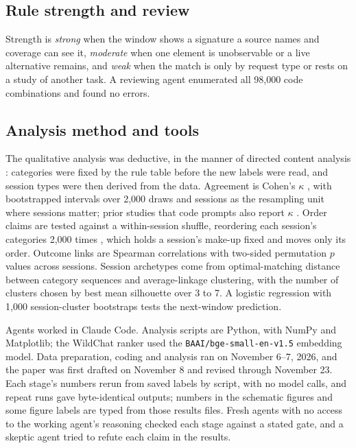 \documentclass[manuscript,screen]{acmart}
\newcommand{\code}[1]{\texttt{#1}}
\begin{document}
\subsection{Rule strength and review}

Strength is \emph{strong} when the window shows a signature a source names and coverage can see it, \emph{moderate} when one element is unobservable or a live alternative remains, and \emph{weak} when the match is only by request type or rests on a study of another task. A reviewing agent enumerated all 98,000 code combinations and found no errors.

\subsection{Analysis method and tools}

The qualitative analysis was deductive, in the manner of directed content analysis \cite{hsieh2005}: categories were fixed by the rule table before the new labels were read, and session types were then derived from the data. Agreement is Cohen's $\kappa$ \cite{cohen1960}, with bootstrapped intervals \cite{efron1994} over 2,000 draws and sessions as the resampling unit where sessions matter; prior studies that code prompts also report $\kappa$ \cite{jelson2026chi,poquet2026}. Order claims are tested against a within-session shuffle, reordering each session's categories 2,000 times \cite{good2005}, which holds a session's make-up fixed and moves only its order. Outcome links are Spearman correlations \cite{spearman1904} with two-sided permutation $p$ values across sessions. Session archetypes come from optimal-matching distance between category sequences \cite{abbott2000} and average-linkage clustering, with the number of clusters chosen by best mean silhouette \cite{rousseeuw1987} over 3 to 7. A logistic regression with 1,000 session-cluster bootstraps tests the next-window prediction.

Agents worked in Claude Code. Analysis scripts are Python, with NumPy and Matplotlib; the WildChat ranker used the \code{BAAI/bge-small-en-v1.5} embedding model. Data preparation, coding and analysis ran on November 6--7, 2026, and the paper was first drafted on November 8 and revised through November 23. Each stage's numbers rerun from saved labels by script, with no model calls, and repeat runs gave byte-identical outputs; numbers in the schematic figures and some figure labels are typed from those results files. Fresh agents with no access to the working agent's reasoning checked each stage against a stated gate, and a skeptic agent tried to refute each claim in the results.
\end{document}
